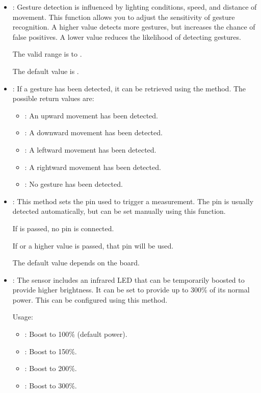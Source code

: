 \begin{itemize}
	\item {}: Gesture detection is influenced by lighting conditions, speed, and distance of movement. This function allows you to adjust the sensitivity of gesture recognition. A higher value detects more gestures, but increases the chance of false positives. A lower value reduces the likelihood of detecting gestures.
	
	The valid range is  to .
	
	The default value is .
	
	\item {}: If a gesture has been detected, it can be retrieved using the  method. The possible return values are:
	
	\begin{itemize}
		\item {}: An upward movement has been detected.
		\item {}: A downward movement has been detected.
		\item {}: A leftward movement has been detected.
		\item {}: A rightward movement has been detected.
		\item {}: No gesture has been detected.
	\end{itemize}
	
	\item {}: This method sets the pin used to trigger a measurement. The pin is usually detected automatically, but can be set manually using this function.
	
	If  is passed, no pin is connected.
	
	If  or a higher value is passed, that pin will be used.
	
	The default value depends on the board.
	
	\item {}: The sensor includes an infrared LED that can be temporarily boosted to provide higher brightness. It can be set to provide up to 300\% of its normal power. This can be configured using this method.
	
	\medskip
	
	Usage:
	
	\begin{itemize}
		\item {}: Boost to 100\% (default power).
		\item {}: Boost to 150\%.
		\item {}: Boost to 200\%.
		\item {}: Boost to 300\%.
	\end{itemize}    
	

\end{itemize}

